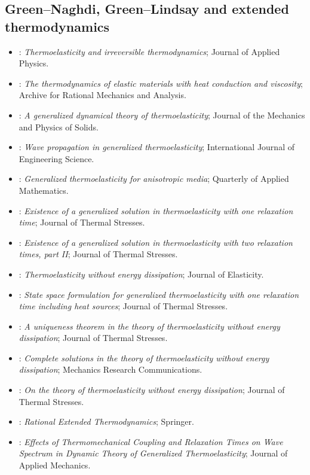 \subsection{Green--Naghdi, Green--Lindsay and extended thermodynamics}
\begin{itemize}\itemsep0pt\small
\item \citet{Biot1956}: \emph{Thermoelasticity and irreversible thermodynamics}; Journal of Applied Physics.
\item \citet{Coleman1963}: \emph{The thermodynamics of elastic materials with heat conduction and viscosity}; Archive for Rational Mechanics and Analysis.
\item \citet{Lord1967}: \emph{A generalized dynamical theory of thermoelasticity}; Journal of the Mechanics and Physics of Solids.
\item \citet{McCarthy1972}: \emph{Wave propagation in generalized thermoelasticity}; International Journal of Engineering Science.
\item \citet{Dhaliwal1980}: \emph{Generalized thermoelasticity for anisotropic media}; Quarterly of Applied Mathematics.
\item \citet{Bem1982}: \emph{Existence of a generalized solution in thermoelasticity with one relaxation time}; Journal of Thermal Stresses.
\item \citet{Bem1983}: \emph{Existence of a generalized solution in thermoelasticity with two relaxation times, part II}; Journal of Thermal Stresses.
\item \citet{Green1993}: \emph{Thermoelasticity without energy dissipation}; Journal of Elasticity.
\item \citet{Sherief1993}: \emph{State space formulation for generalized thermoelasticity with one relaxation time including heat sources}; Journal of Thermal Stresses.
\item \citet{Chandrasekharaiah1996}: \emph{A uniqueness theorem in the theory of thermoelasticity without energy dissipation}; Journal of Thermal Stresses.
\item \citet{Chandrasekharaiah1997}: \emph{Complete solutions in the theory of thermoelasticity without energy dissipation}; Mechanics Research Communications.
\item \citet{Iesan1998}: \emph{On the theory of thermoelasticity without energy dissipation}; Journal of Thermal Stresses.
\item \citet{MuellerRuggeri1998}: \emph{Rational Extended Thermodynamics}; Springer.
\item \citet{Suh1998}: \emph{Effects of Thermomechanical Coupling and Relaxation Times on Wave Spectrum in Dynamic Theory of Generalized Thermoelasticity}; Journal of Applied Mechanics.

\end{itemize}
